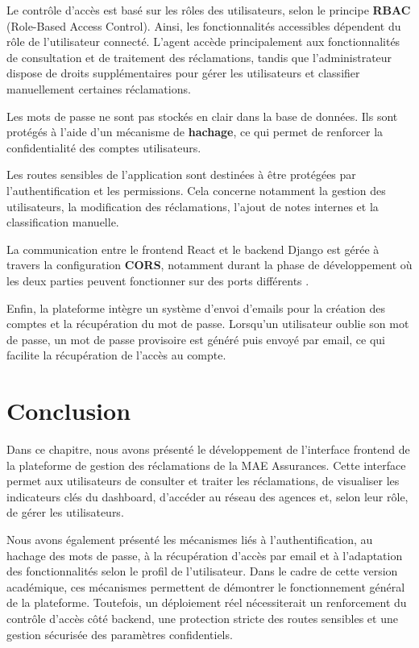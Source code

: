 \documentclass[12pt,a4paper,oneside]{report}
\begin{document}
Le contrôle d’accès est basé sur les rôles des utilisateurs, selon le principe \textbf{RBAC} (Role-Based Access Control). Ainsi, les fonctionnalités accessibles dépendent du rôle de l’utilisateur connecté. L’agent accède principalement aux fonctionnalités de consultation et de traitement des réclamations, tandis que l’administrateur dispose de droits supplémentaires pour gérer les utilisateurs et classifier manuellement certaines réclamations.

Les mots de passe ne sont pas stockés en clair dans la base de données. Ils sont protégés à l’aide d’un mécanisme de \textbf{hachage}, ce qui permet de renforcer la confidentialité des comptes utilisateurs.

Les routes sensibles de l’application sont destinées à être protégées par l’authentification et les permissions. Cela concerne notamment la gestion des utilisateurs, la modification des réclamations, l’ajout de notes internes et la classification manuelle.

La communication entre le frontend React et le backend Django est gérée à travers la configuration \textbf{CORS}, notamment durant la phase de développement où les deux parties peuvent fonctionner sur des ports différents \cite{mdncors}.

Enfin, la plateforme intègre un système d’envoi d’emails pour la création des comptes et la récupération du mot de passe. Lorsqu’un utilisateur oublie son mot de passe, un mot de passe provisoire est généré puis envoyé par email, ce qui facilite la récupération de l’accès au compte.

\section{Conclusion}


Dans ce chapitre, nous avons présenté le développement de l’interface frontend 
de la plateforme de gestion des réclamations de la MAE Assurances. Cette 
interface permet aux utilisateurs de consulter et traiter les réclamations, 
de visualiser les indicateurs clés du dashboard, d’accéder au réseau des 
agences et, selon leur rôle, de gérer les utilisateurs.

Nous avons également présenté les mécanismes liés à l’authentification, au 
hachage des mots de passe, à la récupération d’accès par email et à 
l’adaptation des fonctionnalités selon le profil de l’utilisateur. Dans le 
cadre de cette version académique, ces mécanismes permettent de démontrer le 
fonctionnement général de la plateforme. Toutefois, un déploiement réel 
nécessiterait un renforcement du contrôle d’accès côté backend, une protection 
stricte des routes sensibles et une gestion sécurisée des paramètres 
confidentiels.
\end{document}
